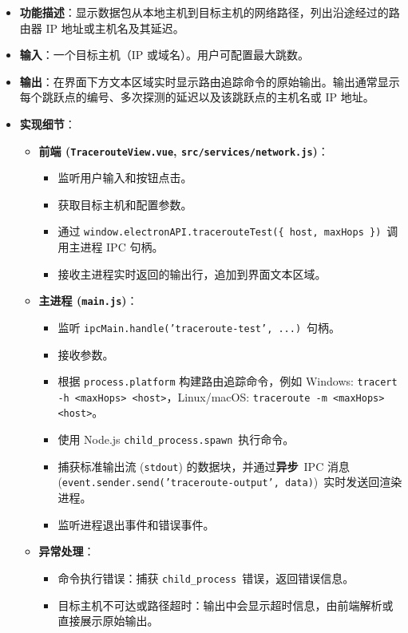 \documentclass{article}
\begin{document}
\begin{itemize}
    \item \textbf{功能描述}：显示数据包从本地主机到目标主机的网络路径，列出沿途经过的路由器 IP 地址或主机名及其延迟。
    \item \textbf{输入}：一个目标主机（IP 或域名）。用户可配置最大跳数。
    \item \textbf{输出}：在界面下方文本区域实时显示路由追踪命令的原始输出。输出通常显示每个跳跃点的编号、多次探测的延迟以及该跳跃点的主机名或 IP 地址。
    \item \textbf{实现细节}：
    \begin{itemize}
        \item \textbf{前端 (\texttt{TracerouteView.vue}, \texttt{src/services/network.js})}：
        \begin{itemize}
            \item 监听用户输入和按钮点击。
            \item 获取目标主机和配置参数。
            \item 通过 \texttt{window.electronAPI.tracerouteTest(\{ host, maxHops \})}\ 调用主进程 IPC 句柄。
            \item 接收主进程实时返回的输出行，追加到界面文本区域。
        \end{itemize}
        \item \textbf{主进程 (\texttt{main.js})}：
        \begin{itemize}
            \item 监听 \texttt{ipcMain.handle('traceroute-test', ...)}\ 句柄。
            \item 接收参数。
            \item 根据 \texttt{process.platform} 构建路由追踪命令，例如 Windows: \texttt{tracert -h <maxHops> <host>}，Linux/macOS: \texttt{traceroute -m <maxHops> <host>}。
            \item 使用 Node.js \texttt{child\_process.spawn}\ 执行命令。
            \item 捕获标准输出流 (\texttt{stdout}) 的数据块，并通过\textbf{异步}\ IPC 消息 (\texttt{event.sender.send('traceroute-output', data)})\ 实时发送回渲染进程。
            \item 监听进程退出事件和错误事件。
        \end{itemize}
        \item \textbf{异常处理}：
        \begin{itemize}
            \item 命令执行错误：捕获 \texttt{child\_process}\ 错误，返回错误信息。
            \item 目标主机不可达或路径超时：输出中会显示超时信息，由前端解析或直接展示原始输出。
        \end{itemize}
    \end{itemize}
\end{itemize}
\end{document}
